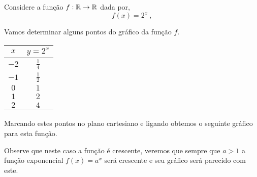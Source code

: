  \begin{exem}\label{ex:exp-2}
  Considere a função $f: \mathbb{R} \rightarrow \mathbb{R} $ dada por,
\begin{equation*}
f(x) = 2^x \ , 
\end{equation*}
  
  Vamos determinar alguns pontos do gráfico da função $f$.

  \begin{table}[H]
  \centering
  \begin{tabular}{|c|c|} \hline
  \rowcolor{gray}
  $x$ & $y=2^x$ \\ \hline
  $-2$ & $\frac{1}{4}$ \\ \hline
  $-1$ & $\frac{1}{2}$ \\ \hline
  $0$ &  $1$ \\ \hline
  $1$ &  $2$ \\ \hline
  $2$ &  $4$ \\ \hline
  \end{tabular}
  \end{table}

  Marcando estes pontos no plano cartesiano e ligando obtemos o seguinte gráfico para esta função.

    \begin{center}
    \end{center}
    

  Observe que neste caso a função é crescente, veremos que sempre que $a>1$ a função exponencial $f(x)=a^x$ será crescente e seu gráfico será parecido com este.

 \end{exem}


